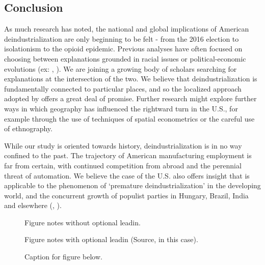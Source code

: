 \documentclass[]{AEA}
\begin{document}
\subsection{Conclusion}

As much research has noted, the national and global implications of
American deindustrialization are only beginning to be felt - from the
2016 election to isolationism to the opioid epidemic. Previous analyses
have often focused on choosing between explanations grounded in racial
issues or political-economic evolutions (ex: \cite{Green19},
\cite{Reny19}). We are joining a growing body of scholars searching for
explanations at the intersection of the two. We believe that
deindustrialization is fundamentally connected to particular places, and
so the localized approach adopted by \cite{Baccini21} offers a great
deal of promise. Further research might explore further ways in which
geography has influenced the rightward turn in the U.S., for example
through the use of techniques of spatial econometrics or the careful use
of ethnography.

While our study is oriented towards history, deindustrialization is in
no way confined to the past. The trajectory of American manufacturing
employment is far from certain, with continued competition from abroad
and the perennial threat of automation. We believe the case of the U.S.
also offers insight that is applicable to the phenomenon of `premature
deindustrialization' in the developing world, and the concurrent growth
of populist parties in Hungary, Brazil, India and elsewhere
(\cite{Rodrik15}, \cite{Castillo16}).

\begin{figure} \label{}
\caption{Caption for figure below.}

\begin{figurenotes}
Figure notes without optional leadin.
\end{figurenotes}
\begin{figurenotes}[Source]
Figure notes with optional leadin (Source, in this case).
\end{figurenotes}
\end{figure}

\nocite{Stargazer}



\end{document}
